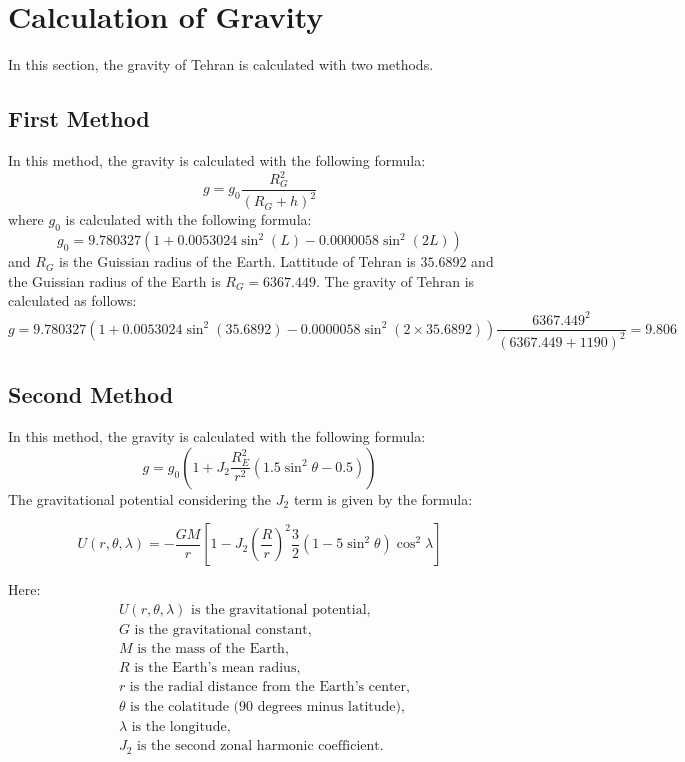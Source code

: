 \section{Calculation of Gravity}
In this section, the gravity of Tehran is calculated with two methods.
\subsection{First Method}
In this method, the gravity is calculated with the following formula:
\begin{equation}
    g = g_0\dfrac{R_G^2}{(R_G+h)^2}
\end{equation}
where $g_0$ is calculated with the following formula:
\begin{equation}
    g_0 = 9.780327(1+0.0053024\sin^2(L)-0.0000058\sin^2(2L))
\end{equation}
and $R_G$ is the Guissian radius of the Earth.
Lattitude of Tehran is $35.6892$ and the Guissian radius of the Earth is $R_G = 6367.449$.
The gravity of Tehran is calculated as follows:
\begin{equation}
    g = 9.780327(1+0.0053024\sin^2(35.6892)-0.0000058\sin^2(2\times35.6892))\dfrac{6367.449^2}{(6367.449+1190)^2} = 9.806
\end{equation}
\subsection{Second Method}
In this method, the gravity is calculated with the following formula:
\begin{equation}
    g = g_0(1+J_2\dfrac{R_E^2}{r^2}(1.5\sin^2\theta-0.5))
\end{equation}
The gravitational potential considering the \(J_2\) term is given by the formula:

\[
U(r, \theta, \lambda) = -\frac{GM}{r} \left[1 - J_2 \left(\frac{R}{r}\right)^2 \frac{3}{2} \left(1 - 5\sin^2\theta\right)\cos^2\lambda\right]
\]

Here:
\begin{align*}
& U(r, \theta, \lambda) \text{ is the gravitational potential}, \\
& G \text{ is the gravitational constant}, \\
& M \text{ is the mass of the Earth}, \\
& R \text{ is the Earth's mean radius}, \\
& r \text{ is the radial distance from the Earth's center}, \\
& \theta \text{ is the colatitude (90 degrees minus latitude)}, \\
& \lambda \text{ is the longitude}, \\
& J_2 \text{ is the second zonal harmonic coefficient}.
\end{align*}

